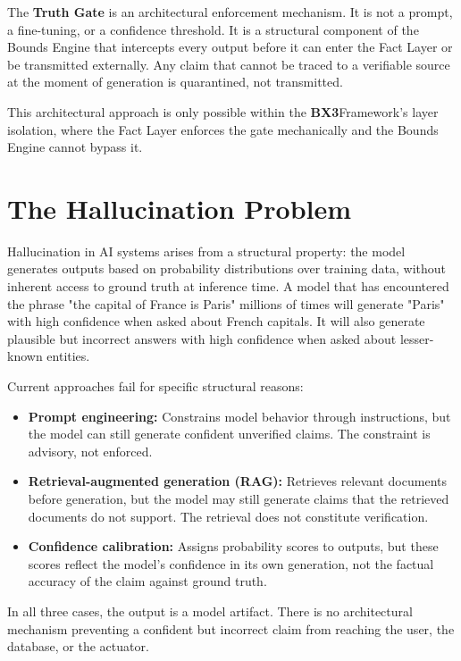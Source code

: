 \documentclass[12pt]{article}
\newcommand{\bxthree}{\textbf{BX3}}
\begin{document}
The \textbf{Truth Gate} is an architectural enforcement mechanism. It is not a prompt, a fine-tuning, or a confidence threshold. It is a structural component of the Bounds Engine that intercepts every output before it can enter the Fact Layer or be transmitted externally. Any claim that cannot be traced to a verifiable source at the moment of generation is quarantined, not transmitted.

This architectural approach is only possible within the \bxthree Framework's layer isolation, where the Fact Layer enforces the gate mechanically and the Bounds Engine cannot bypass it.

\section{The Hallucination Problem}
\label{sec:problem}

Hallucination in AI systems arises from a structural property: the model generates outputs based on probability distributions over training data, without inherent access to ground truth at inference time. A model that has encountered the phrase "the capital of France is Paris" millions of times will generate "Paris" with high confidence when asked about French capitals. It will also generate plausible but incorrect answers with high confidence when asked about lesser-known entities.

Current approaches fail for specific structural reasons:

\begin{itemize}[noitemsep]
\item \textbf{Prompt engineering:} Constrains model behavior through instructions, but the model can still generate confident unverified claims. The constraint is advisory, not enforced.
\item \textbf{Retrieval-augmented generation (RAG):} Retrieves relevant documents before generation, but the model may still generate claims that the retrieved documents do not support. The retrieval does not constitute verification.
\item \textbf{Confidence calibration:} Assigns probability scores to outputs, but these scores reflect the model's confidence in its own generation, not the factual accuracy of the claim against ground truth.
\end{itemize}

In all three cases, the output is a model artifact. There is no architectural mechanism preventing a confident but incorrect claim from reaching the user, the database, or the actuator.
\end{document}
